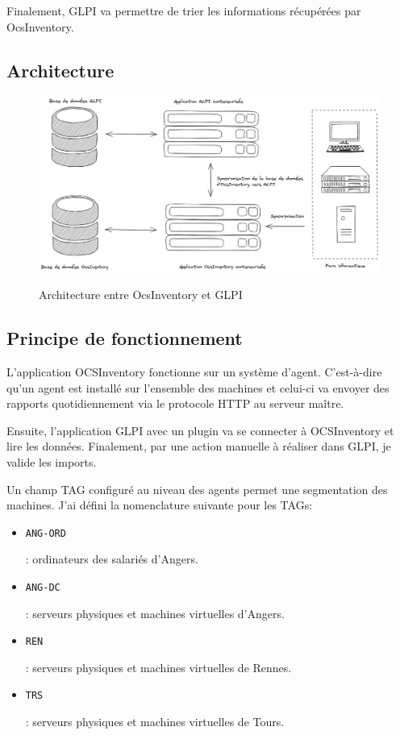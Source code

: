 \documentclass[12pt]{article}
\begin{document}
Finalement, \gls{GLPI} va permettre de trier les informations récupérées par OcsInventory.

\subsection{Architecture}
\begin{figure}[!ht]
    \centering
    \includegraphics[width=\textwidth]{src/graph_glpi.png}
    \label{fig:glpi}
    \caption{Architecture entre OcsInventory et \gls{GLPI}}
\end{figure}

\newpage
\subsection{Principe de fonctionnement}
L'application \gls{OCSInventory} fonctionne sur un système d'agent.
C'est-à-dire qu'un agent est installé sur l'ensemble des machines et celui-ci va envoyer des rapports quotidiennement via le protocole HTTP au serveur maître. 

Ensuite, l'application \gls{GLPI} avec un plugin va se connecter à \gls{OCSInventory} et lire les données.
Finalement, par une action manuelle à réaliser dans \gls{GLPI}, je valide les imports.

Un champ TAG configuré au niveau des agents permet une segmentation des machines.
J'ai défini la nomenclature suivante pour les TAGs:
\begin{itemize}
    \item \begin{code}\texttt{ANG-ORD}\end{code}: ordinateurs des salariés d'Angers.
    \item \begin{code}\texttt{ANG-DC}\end{code}: serveurs physiques et machines virtuelles d'Angers.
    \item \begin{code}\texttt{REN}\end{code}: serveurs physiques et machines virtuelles de Rennes.
    \item \begin{code}\texttt{TRS}\end{code}: serveurs physiques et machines virtuelles de Tours.
\end{itemize}
\end{document}
